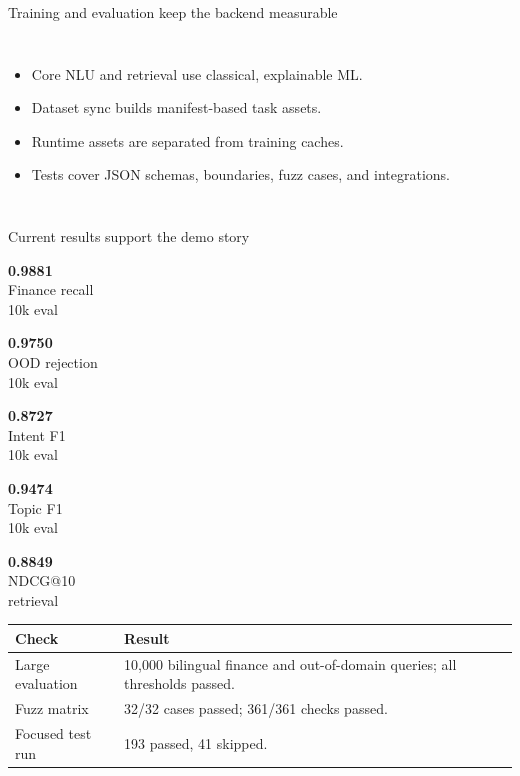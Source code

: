\documentclass[10pt]{beamer}
\newcommand{\metric}[3]{%
  \begin{minipage}{0.18\textwidth}
    \centering
    {\Large\bfseries\textcolor{myNewColorC}{#1}}\\[-0.15em]
    {\scriptsize #2}\\[-0.1em]
    {\tiny\textcolor{mutedInk}{#3}}
  \end{minipage}
}
\begin{document}
\begin{frame}{Training and evaluation keep the backend measurable}
  \begin{columns}[T,onlytextwidth]
      \begin{itemize}
        \item Core NLU and retrieval use classical, explainable ML.
        \item Dataset sync builds manifest-based task assets.
        \item Runtime assets are separated from training caches.
        \item Tests cover JSON schemas, boundaries, fuzz cases, and integrations.
      \end{itemize}
  \end{columns}
\end{frame}

\begin{frame}{Current results support the demo story}
  \centering
  \metric{0.9881}{Finance recall}{10k eval}
  \metric{0.9750}{OOD rejection}{10k eval}
  \metric{0.8727}{Intent F1}{10k eval}
  \metric{0.9474}{Topic F1}{10k eval}
  \metric{0.8849}{NDCG@10}{retrieval}

  \vspace{0.7em}
  \begin{tabularx}{0.90\textwidth}{lX}
    \toprule
    Check & Result \\
    \midrule
    Large evaluation & 10,000 bilingual finance and out-of-domain queries; all thresholds passed. \\
    Fuzz matrix & 32/32 cases passed; 361/361 checks passed. \\
    Focused test run & 193 passed, 41 skipped. \\
    \bottomrule
  \end{tabularx}
\end{frame}
\end{document}
